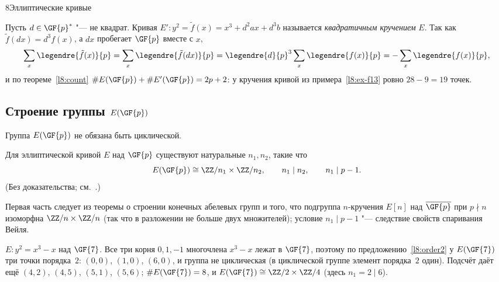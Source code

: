 \begin{lecture}{8}{Эллиптические кривые}
\begin{remark}[кручение]
Пусть $d \in \GF{p}^*$ "--- не квадрат. Кривая $E'\colon y^2 = \tilde f(x) = x^3 + d^2 a x + d^3 b$
называется \emph{квадратичным кручением} $E$. Так как $\tilde f(dx) = d^3 f(x)$, а $dx$ пробегает
$\GF{p}$ вместе с $x$,
\[
  \sum_x \legendre{\tilde f(x)}{p} = \sum_x \legendre{\tilde f(dx)}{p}
  = \legendre{d}{p}^3 \sum_x \legendre{f(x)}{p} = -\sum_x \legendre{f(x)}{p},
\]
и по теореме~\ref{l8:count} $\#E(\GF{p}) + \#E'(\GF{p}) = 2p + 2$: у кручения кривой из примера~\ref{l8:ex-f13} ровно
$28 - 9 = 19$ точек.
\end{remark}


\subsection{Строение группы $E(\GF{p})$}

Группа $E(\GF{p})$ не обязана быть циклической.

\begin{theorem}\label{l8:structure}
Для эллиптической кривой $E$ над $\GF{p}$ существуют натуральные $n_1, n_2$, такие что
\[
  E(\GF{p}) \cong \ZZ/n_1 \times \ZZ/n_2, \qquad n_1 \mid n_2, \qquad n_1 \mid p - 1.
\]
(Без доказательства; см.~\cite[разд.~4.1]{washington}.)
\end{theorem}

Первая часть следует из теоремы о строении конечных абелевых групп и того, что подгруппа
$n$-кручения $E[n]$ над $\overline{\GF{p}}$ при $p \nmid n$ изоморфна $\ZZ/n \times \ZZ/n$
(так что в разложении не больше двух множителей); условие $n_1 \mid p - 1$ "--- следствие
свойств спаривания Вейля.

\begin{example}
$E\colon y^2 = x^3 - x$ над $\GF{7}$. Все три корня $0, 1, -1$ многочлена $x^3 - x$ лежат в
$\GF{7}$, поэтому по предложению~\ref{l8:order2} у $E(\GF{7})$ три точки порядка~$2$: $(0, 0)$,
$(1, 0)$, $(6, 0)$, и группа не циклическая (в циклической группе элемент порядка~$2$ один).
Подсчёт даёт ещё $(4, 2)$, $(4, 5)$, $(5, 1)$, $(5, 6)$; $\#E(\GF{7}) = 8$, и
$E(\GF{7}) \cong \ZZ/2 \times \ZZ/4$ (здесь $n_1 = 2 \mid 6$).
\end{example}




\end{lecture}
